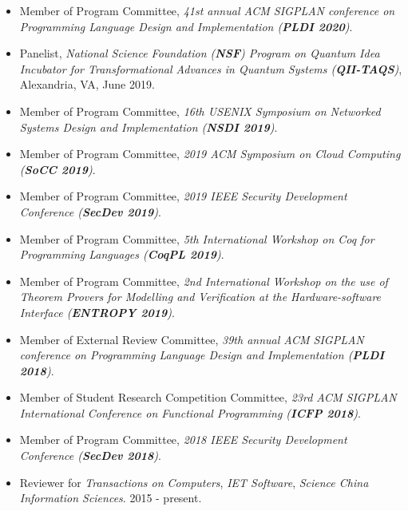 \documentclass[10pt]{article}
\newenvironment{innerlist}[1][\enskip\textbullet]%
        {\begin{itemize}[#1,leftmargin=25pt,parsep=0pt,itemsep=2pt,topsep=2pt,partopsep=0pt]}
        {\end{itemize}}
\begin{document}
\begin{innerlist}



\item[] Member of Program Committee,
\emph{41st annual ACM SIGPLAN conference on Programming Language Design and Implementation (\textbf{PLDI 2020})}.
\vspace{0.05in}

\item[] Panelist,  \emph{National Science Foundation (\textbf{NSF}) Program on Quantum Idea Incubator for Transformational Advances in Quantum Systems (\textbf{QII-TAQS})},  Alexandria, VA, June 2019.

\vspace{0.05in}

\item[] Member of Program Committee,
\emph{16th USENIX Symposium on Networked Systems Design and Implementation (\textbf{NSDI 2019})}.
\vspace{0.05in}

\item[] Member of Program Committee,
\emph{2019 ACM Symposium on Cloud Computing (\textbf{SoCC 2019})}.
\vspace{0.05in}

\item[] Member of Program Committee,
\emph{2019 IEEE Security Development Conference (\textbf{SecDev 2019})}.
\vspace{0.05in}

\item[] Member of Program Committee,
\emph{5th International Workshop on Coq for Programming Languages (\textbf{CoqPL 2019})}.
\vspace{0.05in}

\item[] Member of Program Committee,
\emph{2nd International Workshop on the use of Theorem Provers for Modelling and
Verification at the Hardware-software Interface (\textbf{ENTROPY 2019})}.
\vspace{0.05in}

\item[] Member of External Review Committee,
\emph{39th annual ACM SIGPLAN conference on Programming Language Design and Implementation (\textbf{PLDI 2018})}.
\vspace{0.05in}

\item[]  Member of Student Research Competition Committee, 
\emph{23rd ACM SIGPLAN International Conference on Functional Programming (\textbf{ICFP 2018})}.
\vspace{0.05in}


\item[] Member of Program Committee,
\emph{2018 IEEE Security Development Conference (\textbf{SecDev 2018})}.
\vspace{0.05in}

\item[] Reviewer for
\emph{Transactions on Computers},
\emph{IET Software},
\emph{Science China Information Sciences}. 2015 - present.

\end{innerlist}
\end{document}
